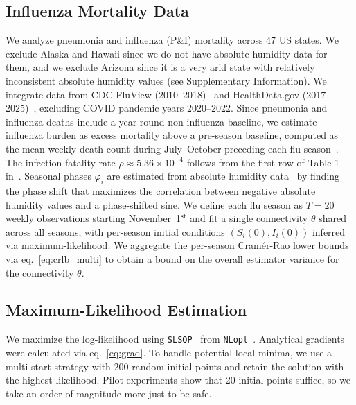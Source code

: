 \subsection{Influenza Mortality Data}\label{subsec:real_data}
We analyze pneumonia and influenza (P\&I) mortality across 47 US
states.  We exclude Alaska and Hawaii since we do not have absolute
humidity data for them, and we exclude Arizona since it is a very arid
state with relatively inconsistent absolute humidity values (see
Supplementary Information). We integrate data from CDC FluView
(2010--2018)~\citep{cdcfluview2024} and HealthData.gov
(2017--2025)~\citep{healthdatagov2025}, excluding COVID pandemic years
2020--2022. Since pneumonia and influenza deaths include a year-round
non-influenza baseline, we estimate influenza burden as excess
mortality above a pre-season baseline, computed as the mean weekly
death count during July--October preceding each flu
season~\citep{serfling1963, viboud2006}. The infection fatality rate
$\rho \approx 5.36 \times 10^{-4}$ follows from the first row of Table
1 in~\citet{rolfes2018}. Seasonal phases $\varphi_i$ are estimated
from absolute humidity data~\citep{daon2025, shaman2009} by finding
the phase shift that maximizes the correlation between negative
absolute humidity values and a phase-shifted sine. We define each flu season as $T = 20$ weekly observations
starting November~1$^{\text{st}}$ and fit a single connectivity
$\theta$ shared across all seasons, with per-season initial conditions
$(S_i(0), I_i(0))$ inferred via maximum-likelihood. We aggregate the
per-season Cram\'er-Rao lower bounds via eq.~\eqref{eq:crlb_multi} to
obtain a bound on the overall estimator variance for the connectivity
$\theta$.
 
\subsection{Maximum-Likelihood Estimation}\label{subsec:mle}
We maximize the log-likelihood using
\texttt{SLSQP}~\citep{kraft1988, kraft1994} from
\texttt{NLopt}~\citep{NLopt}. Analytical gradients were calculated via
eq.~\eqref{eq:grad}. To handle potential local minima, we use a
multi-start strategy with 200 random initial points and retain the
solution with the highest likelihood. Pilot experiments show that 20
initial points suffice, so we take an order of magnitude more just to
be safe.


